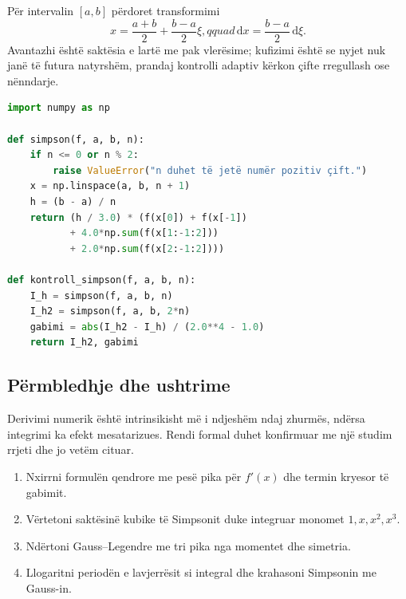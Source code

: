 \documentclass[11pt,oneside,openany]{book}
\newcommand{\dd}{\,\mathrm{d}}
\begin{document}
Për intervalin $[a,b]$ përdoret transformimi
\begin{equation}
 x=\frac{a+b}{2}+\frac{b-a}{2}\xi,qquad
 \dd x=\frac{b-a}{2}\dd\xi.
\end{equation}
Avantazhi është saktësia e lartë me pak vlerësime; kufizimi është se nyjet nuk janë të futura natyrshëm, prandaj kontrolli adaptiv kërkon çifte rregullash ose nënndarje.

\begin{lstlisting}[language=Python,caption={Simpson i përbërë me kontroll të dyfishimit të rrjetit.}]
import numpy as np

def simpson(f, a, b, n):
    if n <= 0 or n % 2:
        raise ValueError("n duhet të jetë numër pozitiv çift.")
    x = np.linspace(a, b, n + 1)
    h = (b - a) / n
    return (h / 3.0) * (f(x[0]) + f(x[-1])
           + 4.0*np.sum(f(x[1:-1:2]))
           + 2.0*np.sum(f(x[2:-1:2])))

def kontroll_simpson(f, a, b, n):
    I_h = simpson(f, a, b, n)
    I_h2 = simpson(f, a, b, 2*n)
    gabimi = abs(I_h2 - I_h) / (2.0**4 - 1.0)
    return I_h2, gabimi
\end{lstlisting}

\subsection{Përmbledhje dhe ushtrime}
Derivimi numerik është intrinsikisht më i ndjeshëm ndaj zhurmës, ndërsa integrimi ka efekt mesatarizues. Rendi formal duhet konfirmuar me një studim rrjeti dhe jo vetëm cituar.
\begin{enumerate}
\item Nxirrni formulën qendrore me pesë pika për $f'(x)$ dhe termin kryesor të gabimit.
\item Vërtetoni saktësinë kubike të Simpsonit duke integruar monomet $1,x,x^2,x^3$.
\item Ndërtoni Gauss--Legendre me tri pika nga momentet dhe simetria.
\item Llogaritni periodën e lavjerrësit si integral dhe krahasoni Simpsonin me Gauss-in.
\end{enumerate}



\end{document}
